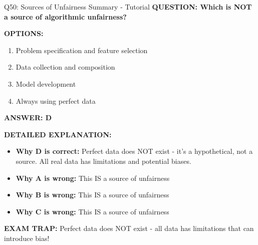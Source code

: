 \documentclass[8pt]{beamer}
\begin{document}
	\begin{frame}{Q50: Sources of Unfairness Summary - Tutorial}
		\fontsize{6.5}{7.5}\selectfont
		\textbf{QUESTION: Which is NOT a source of algorithmic unfairness?}
		
		\vspace{0.1cm}
		\textbf{OPTIONS:}
		\begin{enumerate}
			\item Problem specification and feature selection
			\item Data collection and composition
			\item Model development
			\item Always using perfect data
		\end{enumerate}
		
		\vspace{0.1cm}
		\textcolor{myblue}{\textbf{ANSWER: D}}
		
		\vspace{0.1cm}
		\textbf{DETAILED EXPLANATION:}
		\begin{itemize}
			\item \textbf{Why D is correct:} Perfect data does NOT exist - it's a hypothetical, not a source. All real data has limitations and potential biases.
			\item \textbf{Why A is wrong:} This IS a source of unfairness
			\item \textbf{Why B is wrong:} This IS a source of unfairness
			\item \textbf{Why C is wrong:} This IS a source of unfairness
		\end{itemize}
		
		\textcolor{myred}{\textbf{EXAM TRAP:}} Perfect data \textcolor{myblue}{does NOT exist} - all data has limitations that can introduce bias!
	\end{frame}
	
	
\end{document}
